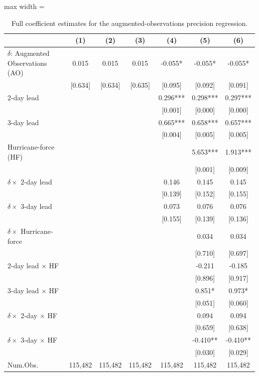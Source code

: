 \begin{table}
\centering
\caption{Full coefficient estimates for the augmented-observations precision regression. \label{tab:precision_full}}
\centering
\begin{adjustbox}{max width = \textwidth}
\begin{threeparttable}
\begin{tabular}[t]{lcccccc}
\toprule
  & (1) & (2) & (3) & (4) & (5) & (6)\\
\midrule
$\delta$: Augmented Observations (AO) & 0.015 & 0.015 & 0.015 & -0.055* & -0.055* & -0.055*\\
 & {}[0.634] & {}[0.634] & {}[0.635] & {}[0.095] & {}[0.092] & {}[0.091]\\
2-day lead &  &  &  & 0.296*** & 0.298*** & 0.297***\\
 &  &  &  & {}[0.001] & {}[0.000] & {}[0.000]\\
3-day lead &  &  &  & 0.665*** & 0.658*** & 0.657***\\
 &  &  &  & {}[0.004] & {}[0.005] & {}[0.005]\\
Hurricane-force (HF) &  &  &  &  & 5.653*** & 1.913***\\
 &  &  &  &  & {}[0.001] & {}[0.009]\\
$\delta \times$ 2-day lead &  &  &  & 0.146 & 0.145 & 0.145\\
 &  &  &  & {}[0.139] & {}[0.152] & {}[0.155]\\
$\delta \times$ 3-day lead &  &  &  & 0.073 & 0.076 & 0.076\\
 &  &  &  & {}[0.155] & {}[0.139] & {}[0.136]\\
$\delta \times$ Hurricane-force &  &  &  &  & 0.034 & 0.034\\
 &  &  &  &  & {}[0.710] & {}[0.697]\\
2-day lead $\times$ HF &  &  &  &  & -0.211 & -0.185\\
 &  &  &  &  & {}[0.896] & {}[0.917]\\
3-day lead $\times$ HF &  &  &  &  & 0.851* & 0.973*\\
 &  &  &  &  & {}[0.051] & {}[0.060]\\
$\delta \times$ 2-day $\times$ HF &  &  &  &  & 0.094 & 0.094\\
 &  &  &  &  & {}[0.659] & {}[0.638]\\
$\delta \times$ 3-day $\times$ HF &  &  &  &  & -0.410** & -0.410**\\
 &  &  &  &  & {}[0.030] & {}[0.029]\\
\midrule
Num.Obs. & 115,482 & 115,482 & 115,482 & 115,482 & 115,482 & 115,482\\

\end{tabular}
\end{threeparttable}
\end{adjustbox}
\end{table}
